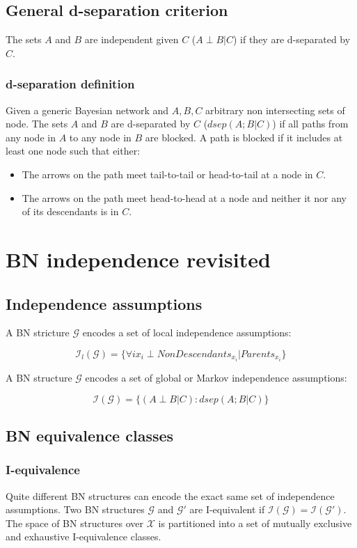 	\subsection{General d-separation criterion}
	The sets $A$ and $B$ are independent given $C$ ($A\perp B|C $) if they are d-separated by $C$.

		\subsubsection{d-separation definition}
		Given a generic Bayesian network and $A,B,C$ arbitrary non intersecting sets of node.
		The sets $A$ and $B$ are d-separated by $C$ ($dsep(A;B|C)$) if all paths from any node in $A$ to any node in $B$ are blocked.
		A path is blocked if it includes at least one node such that either:

		\begin{multicols}{2}
			\begin{itemize}
				\item The arrows on the path meet tail-to-tail or head-to-tail at a node in $C$.
				\item The arrows on the path meet head-to-head at a node and neither it nor any of its descendants is in $C$.
			\end{itemize}
		\end{multicols}

\section{BN independence revisited}

	\subsection{Independence assumptions}
	A BN stricture $\mathcal{G}$ encodes a set of local independence assumptions:

	$$\mathcal{I}_l(\mathcal{G}) = \{\forall i x_i \perp NonDescendants_{x_i} | Parents_{x_i}\}$$

	A BN structure $\mathcal{G}$ encodes a set of global or Markov independence assumptions:

	$$\mathcal{I}(\mathcal{G}) = \{(A\perp B |C):dsep(A;B|C)\}$$

	\subsection{BN equivalence classes}

		\subsubsection{I-equivalence}
		Quite different BN structures can encode the exact same set of independence assumptions.
		Two BN structures $\mathcal{G}$ and $\mathcal{G}'$ are I-equivalent if $\mathcal{I}(\mathcal{G})=\mathcal{I}(\mathcal{G}')$.
		The space of BN structures over $\mathcal{X}$ is partitioned into a set of mutually exclusive and exhaustive I-equivalence classes.

